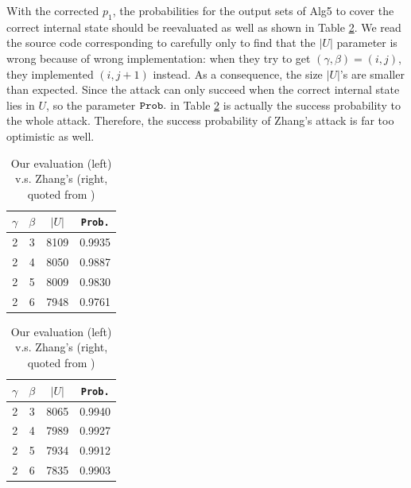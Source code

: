 With the corrected $p_1$, the probabilities for the output sets of Alg5 to cover the correct internal state should be reevaluated as well as shown in Table \ref{tab:ProbInU}. 
We read the source code corresponding to \cite{AC:Zhang19} carefully only to find that the $|U|$ parameter is wrong because of wrong implementation: 
when they try to get $(\gamma , \beta)=(i,j)$, they implemented $(i,j+1)$ instead. 
As a consequence, the size $|U|$'s are smaller than expected. 
Since the attack can only succeed when the correct internal state lies in $U$, so the parameter ${\tt Prob.}$ in Table \ref{tab:ProbInU} is actually the success probability to the whole attack.
Therefore, the success probability of Zhang's attack is far too optimistic as well.
\begin{table}[htbp]
  \centering
  \caption{Our evaluation (left) v.s. Zhang's (right, quoted from \cite{AC:Zhang19})}
  \begin{minipage}[t]{0.45\textwidth}
  \centering
     \begin{tabular}{c|c|c|c}
    \hline
    $\gamma$ & $\beta$ & $|U|$ & {\tt Prob.} \\
    \hline
    \hline
    2     & 3     & 8109  & 0.9935 \\
    2     & 4     & 8050  & 0.9887 \\
    2     & 5     & 8009  & 0.9830 \\
    2     & 6     & 7948  & 0.9761 \\
    \hline
    \end{tabular}%
  \end{minipage}
  \begin{minipage}[t]{0.45\textwidth}
    \centering
        \begin{tabular}{c|c|c|c}
    \hline
    $\gamma$ & $\beta$ & $|U|$ & {\tt Prob.} \\
    \hline
    \hline
    2     & 3     & 8065  & 0.9940 \\
    2     & 4     & 7989  & 0.9927 \\
    2     & 5     & 7934  & 0.9912 \\
    2     & 6     & 7835  & 0.9903 \\
    \hline
    \end{tabular}%
  \end{minipage}
  \label{tab:ProbInU}%
\end{table}%

